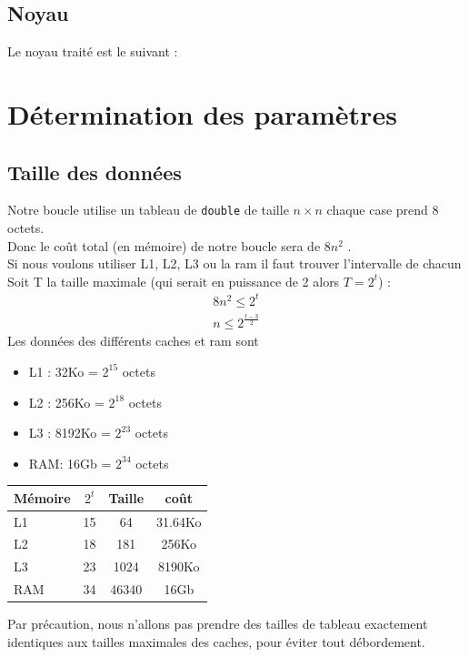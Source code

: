 \documentclass{report}
\begin{document}
  \subsection{Noyau}
  Le noyau traité est le suivant :
    
    
 
\section{Détermination des paramètres}
  \subsection{Taille des données}
    Notre boucle utilise un tableau de \texttt{double} de taille $n\times n$
    chaque case prend 8 octets. \\
    Donc le coût total (en mémoire) de notre boucle sera de $8n^2$ . \\

    Si nous voulons utiliser L1, L2, L3 ou la ram il faut trouver l'intervalle de chacun
    Soit T la taille maximale (qui serait en puissance de 2 alors $T=2^t$) :
    \begin{align}
      8n^2 \leq 2^t \\
      n \leq 2^{\frac{t-3}{2}}
    \end{align}
    Les données des différents caches et ram sont
    \begin{itemize}
      \item L1 : 32Ko   = $2^{15}$ octets
      \item L2 : 256Ko  = $2^{18}$ octets
      \item L3 : 8192Ko = $2^{23}$ octets
      \item RAM: 16Gb   = $2^{34}$ octets
    \end{itemize}
    \vspace{5mm}
    \begin{tabular}{|l| c | c | c|}
      \hline
      Mémoire & $2^t$ & Taille & coût \\\hline
      \hline
      L1 & 15 & 64 & 31.64Ko \\\hline
      L2 & 18 & 181 & 256Ko \\\hline
      L3 & 23 & 1024 & 8190Ko \\\hline
      RAM & 34 & 46340 & 16Gb \\\hline
    \end{tabular}
    
   Par précaution, nous n'allons pas prendre des tailles de tableau exactement identiques aux tailles maximales des caches, pour éviter tout débordement.
\end{document}
